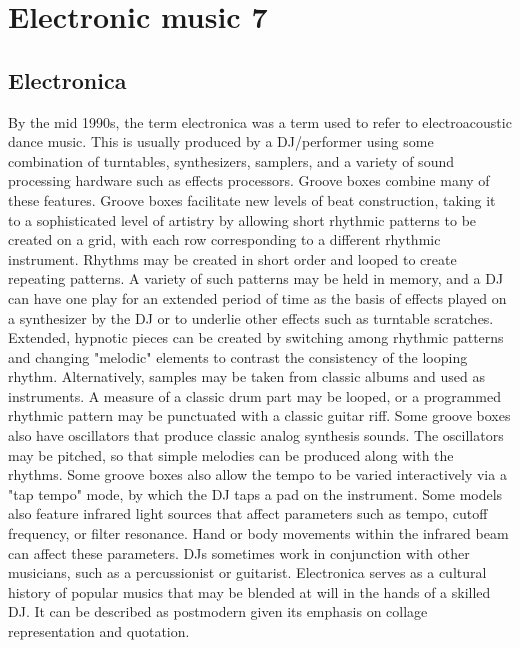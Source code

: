 
\chapter{Electronic music 7}
\label{history7}

\section{Electronica}
By the mid 1990s, the term electronica was a term used to refer to electroacoustic dance music. This is usually produced by a DJ/performer using some combination of turntables, synthesizers, samplers, and a variety of sound processing hardware such as effects processors. Groove boxes combine many of these features. Groove boxes facilitate new levels of beat construction, taking it to a sophisticated level of artistry by allowing short rhythmic patterns to be created on a grid, with each row corresponding to a different rhythmic instrument. Rhythms may be created in short order and looped to create repeating patterns. A variety of such patterns may be held in memory, and a DJ can have one play for an extended period of time as the basis of effects played on a synthesizer by the DJ or to underlie other effects such as turntable scratches. Extended, hypnotic pieces can be created by switching among rhythmic patterns and changing "melodic" elements to contrast the consistency of the looping rhythm. Alternatively, samples may be taken from classic albums and used as instruments. A measure of a classic drum part may be looped, or a programmed rhythmic pattern may be punctuated with a classic guitar riff. Some groove boxes also have oscillators that produce classic analog synthesis sounds. The oscillators may be pitched, so that simple melodies can be produced along with the rhythms. Some groove boxes also allow the tempo to be varied interactively via a "tap tempo" mode, by which the DJ taps a pad on the instrument. Some models also feature infrared light sources that affect parameters such as tempo, cutoff frequency, or filter resonance. Hand or body movements within the infrared beam can affect these parameters. DJs sometimes work in conjunction with other musicians, such as a percussionist or guitarist.
Electronica serves as a cultural history of popular musics that may be blended at will in the hands of a skilled DJ. It can be described as postmodern given its emphasis on collage representation and quotation.


